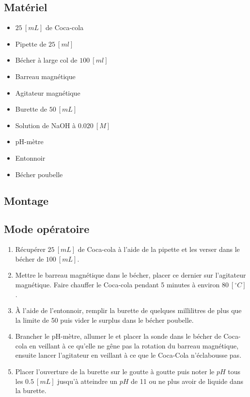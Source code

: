 \documentclass[11pt]{article}
\begin{document}
\subsection{Matériel}\label{subsec:materiel}
\begin{itemize}
\item $25 \ [mL]$ de Coca-cola
\item Pipette de $25 \ [ml]$
\item Bécher à large col de $100 \ [ml]$
\item Barreau magnétique
\item Agitateur magnétique
\item Burette de $50 \ [mL]$
\item Solution de NaOH à $0.020 \ [M]$
\item pH-mètre
\item Entonnoir
\item Bécher poubelle
\end{itemize}

\subsection{Montage}\label{subsec:montage}


\subsection{Mode opératoire}\label{subsec:mode-operatoire}
\begin{enumerate}
\item Récupérer $25 \ [mL]$ de Coca-cola à l'aide de la pipette et les verser dans le bécher de $100 \ [mL]$.
\item Mettre le barreau magnétique dans le bécher, placer ce dernier sur l'agitateur magnétique.
Faire chauffer le Coca-cola pendant 5 minutes à environ $80 \ [^\circ C]$.
\item À l'aide de l'entonnoir, remplir la burette de quelques millilitres de plus que la limite de 50 puis vider
 le surplus dans le bécher poubelle.
\item Brancher le pH-mètre, allumer le et placer la sonde dans le bécher de Coca-cola en veillant à ce qu'elle
 ne gêne pas la rotation du barreau magnétique, ensuite lancer l'agitateur en veillant à ce que le Coca-Cola
 n'éclabousse pas.
\item Placer l'ouverture de la burette sur le goutte à goutte puis noter le $pH$ tous les $0.5 \ [mL]$ jusqu'à
 atteindre un $pH$ de 11 ou ne plus avoir de liquide dans la burette.
\end{enumerate}
\end{document}

